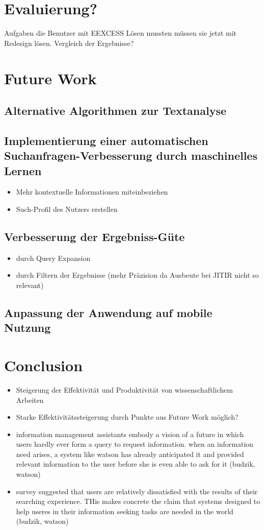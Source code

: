 \section{Evaluierung?}
Aufgaben die Benutzer mit EEXCESS Lösen mussten müssen sie jetzt mit Redesign lösen. Vergleich der Ergebnisse?

\section{Future Work}
 \subsection{Alternative Algorithmen zur Textanalyse}
 \subsection{Implementierung einer automatischen Suchanfragen-Verbesserung durch maschinelles Lernen}
 	\begin{itemize}
 		\item Mehr kontextuelle Informationen miteinbeziehen
 		\item Such-Profil des Nutzers erstellen
 	\end{itemize}
 \subsection{Verbesserung der Ergebniss-Güte}
	\begin{itemize}
		\item durch Query Expansion
 		\item durch Filtern der Ergebnisse (mehr Präzision da Ausbeute bei JITIR nicht so relevant)
	\end{itemize}
 \subsection{Anpassung der Anwendung auf mobile Nutzung}

 \section{Conclusion}
 \begin{itemize}
 		\item Steigerung der Effektivität und Produktivität von wissenschaftlichem Arbeiten
 		\item Starke Effektivitätssteigerung durch Punkte aus Future Work möglich?
 		\item information management assistants embody a vision of a future in which users hardly ever form a query to request information. when an information need arises, a system like watson has already anticipated it and provided relevant information to the user before she is even able to ask for it (budzik, watson)
 		\item survey suggested that users are relatively dissatisfied with the results of their searching experience. THis makes concrete the claim that systems designed to help useres in their information seeking tasks are needed in the world (budzik, watson)
 	\end{itemize}
